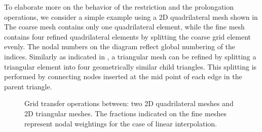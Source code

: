 To elaborate more on the behavior of the restriction and the prolongation operations, we consider a simple example using a 2D quadrilateral mesh shown in 
The coarse mesh contains only one quadrilateral element, while the fine mesh contains four refined quadrilateral elements by splitting the coarse grid element evenly.
The nodal numbers on the diagram reflect global numbering of the indices.
Similarly as indicated in , a triangular mesh can be refined by splitting a triangular element into four geometrically similar child triangles.
This splitting is performed by connecting nodes inserted at the mid point of each edge in the parent triangle.
\begin{figure}[t]
	\centering
	\vfill
	\caption[Multigrid transfer operations.]{Grid transfer operations between: \protect{} two 2D quadrilateral meshes and  \protect{} 2D triangular meshes. The fractions indicated on the fine meshes represent nodal weightings for the case of linear interpolation.}
	\label{fig:grid_trans}
\end{figure}



